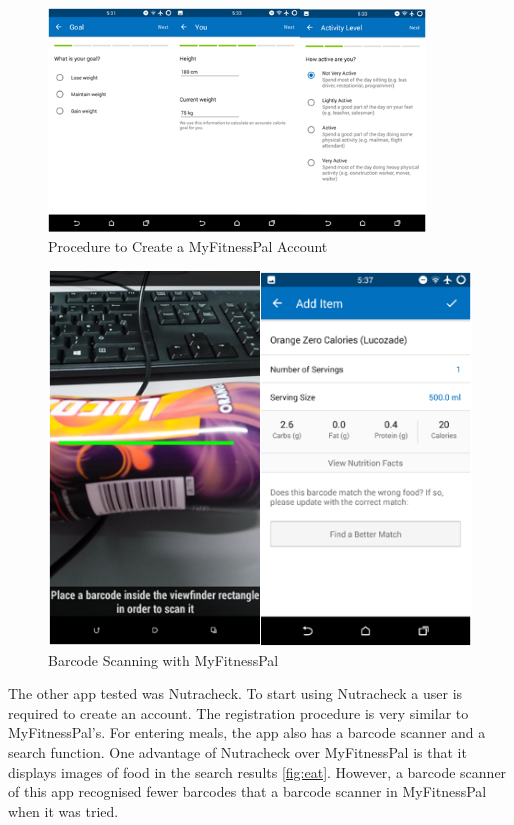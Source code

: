 \begin{figure}[ht]
\centering
\includegraphics[width=10cm]{Figures/2/mfp2.png}
\caption{Procedure to Create a MyFitnessPal Account}
\label{fig:mfp2}
\end{figure}

\begin{figure}[ht]
\centering
\includegraphics{Figures/2/mfp3.PNG}
\caption{Barcode Scanning with MyFitnessPal}
\label{fig:mfp2}
\end{figure}

The other app tested was Nutracheck. To start using Nutracheck a user is required to create an account. The registration procedure is very similar to MyFitnessPal's. For entering meals, the app also has a barcode scanner and a search function. One advantage of Nutracheck over MyFitnessPal is that it displays images of food in the search results \autoref{fig:eat}. However,  a  barcode scanner of this app recognised fewer barcodes that a barcode scanner in MyFitnessPal when it was tried.

